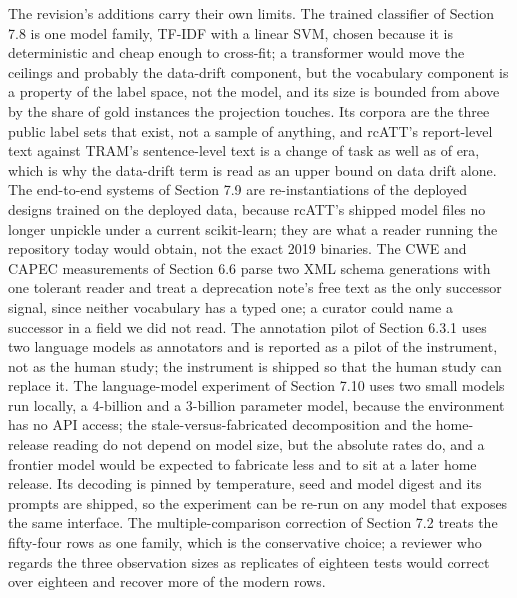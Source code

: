\documentclass[11pt,a4paper]{article}
\begin{document}
The revision's additions carry their own limits. The trained classifier of Section 7.8 is one model family, TF-IDF with a linear SVM, chosen because it is deterministic and cheap enough to cross-fit; a transformer would move the ceilings and probably the data-drift component, but the vocabulary component is a property of the label space, not the model, and its size is bounded from above by the share of gold instances the projection touches. Its corpora are the three public label sets that exist, not a sample of anything, and rcATT's report-level text against TRAM's sentence-level text is a change of task as well as of era, which is why the data-drift term is read as an upper bound on data drift alone. The end-to-end systems of Section 7.9 are re-instantiations of the deployed designs trained on the deployed data, because rcATT's shipped model files no longer unpickle under a current scikit-learn; they are what a reader running the repository today would obtain, not the exact 2019 binaries. The CWE and CAPEC measurements of Section 6.6 parse two XML schema generations with one tolerant reader and treat a deprecation note's free text as the only successor signal, since neither vocabulary has a typed one; a curator could name a successor in a field we did not read. The annotation pilot of Section 6.3.1 uses two language models as annotators and is reported as a pilot of the instrument, not as the human study; the instrument is shipped so that the human study can replace it. The language-model experiment of Section 7.10 uses two small models run locally, a 4-billion and a 3-billion parameter model, because the environment has no API access; the stale-versus-fabricated decomposition and the home-release reading do not depend on model size, but the absolute rates do, and a frontier model would be expected to fabricate less and to sit at a later home release. Its decoding is pinned by temperature, seed and model digest and its prompts are shipped, so the experiment can be re-run on any model that exposes the same interface. The multiple-comparison correction of Section 7.2 treats the fifty-four rows as one family, which is the conservative choice; a reviewer who regards the three observation sizes as replicates of eighteen tests would correct over eighteen and recover more of the modern rows.
\end{document}
